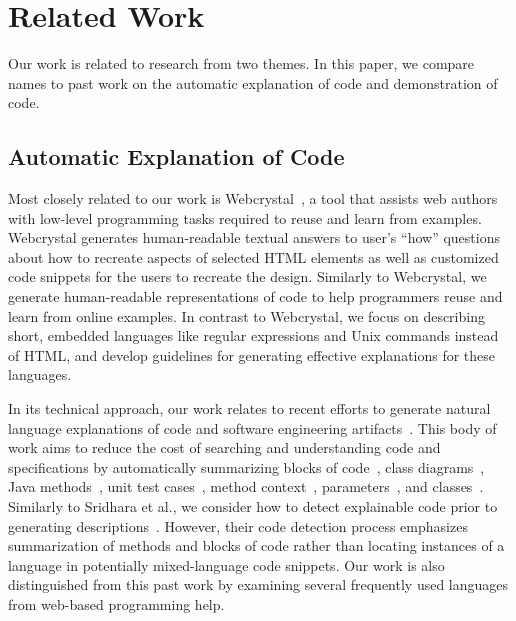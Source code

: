 \section{Related Work}

Our work is related to research from two themes.
In this paper, we compare \Glspl{name} to past work on the automatic explanation of code and demonstration of code.

\subsection{Automatic Explanation of Code}

Most closely related to our work is Webcrystal~\cite{chang_webcrystal_2012}, a tool that assists web authors with low-level programming tasks required to reuse and learn from examples.  
Webcrystal generates human-readable textual answers to user's ``how'' questions about how to recreate aspects of selected HTML elements as well as customized code snippets for the users to recreate the design.
Similarly to Webcrystal, we generate human-readable representations of code to help programmers reuse and learn from online examples.
In contrast to Webcrystal, we focus on describing short, embedded languages like regular expressions and Unix commands instead of HTML, and develop guidelines for generating effective explanations for these languages.

In its technical approach, our work relates to recent efforts to generate natural language explanations of code and software engineering artifacts~\cite{sridhara_automatically_2011,burden_natural_2011,sridhara_towards_2010,kamimura_towards_2013,mcburney_automatic_2014,sridhara_generating_2011,moreno_automatic_2013}.
This body of work aims to reduce the cost of searching and understanding code and specifications by automatically summarizing blocks of code~\cite{sridhara_automatically_2011}, class diagrams~\cite{burden_natural_2011}, Java methods~\cite{sridhara_towards_2010}, unit test cases~\cite{kamimura_towards_2013}, method context~\cite{mcburney_automatic_2014}, parameters~\cite{sridhara_generating_2011}, and classes~\cite{moreno_automatic_2013}.
Similarly to Sridhara et al., we consider how to detect explainable code prior to generating descriptions~\cite{sridhara_automatically_2011,sridhara_towards_2010}.
However, their code detection process emphasizes summarization of methods and blocks of code rather than locating instances of a language in potentially mixed-language code snippets.
Our work is also distinguished from this past work by examining several frequently used languages from web-based programming help.

